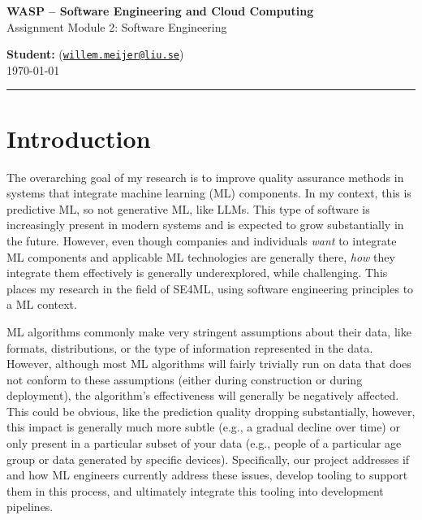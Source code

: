 


\usepackage{minted}



\begin{Large}
    \textsf{\textbf{WASP -- Software Engineering and Cloud Computing}}\\
    \textsf{Assignment Module 2: Software Engineering}
\end{Large}

\vspace{1ex}

\textsf{\textbf{Student:}}  (\href{mailto:willem.meijer@liu.se}{\texttt{willem.meijer@liu.se}})\\
\today

\noindent\rule[0.5ex]{\linewidth}{1pt}

\section*{Introduction}



    The overarching goal of my research is to improve quality assurance methods in systems that integrate machine learning (ML) components.
    In my context, this is predictive ML, so not generative ML, like LLMs.
    This type of software is increasingly present in modern systems and is expected to grow substantially in the future.
    However, even though companies and individuals \textit{want} to integrate ML components and applicable ML technologies are generally there, \textit{how} they integrate them effectively is generally underexplored, while challenging.
    This places my research in the field of SE4ML, using software engineering principles to a ML context.
    
    ML algorithms commonly make very stringent assumptions about their data, like formats, distributions, or the type of information represented in the data.
    However, although most ML algorithms will fairly trivially run on data that does not conform to these assumptions (either during construction or during deployment), the algorithm's effectiveness will generally be negatively affected.
    This could be obvious, like the prediction quality dropping substantially, however, this impact is generally much more subtle (e.g., a gradual decline over time) or only present in a particular subset of your data (e.g., people of a particular age group or data generated by specific devices).
    Specifically, our project addresses if and how ML engineers currently address these issues, develop tooling to support them in this process, and ultimately integrate this tooling into development pipelines.
    
